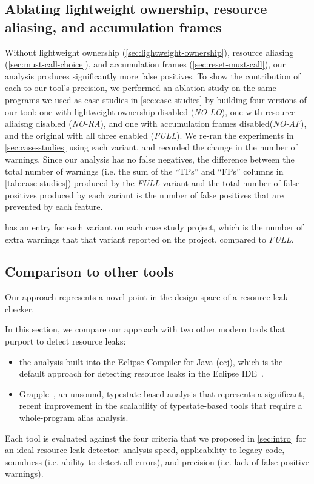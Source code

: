 \subsection{Ablating lightweight ownership, resource aliasing, and accumulation frames}
\label{sec:ablation}

Without lightweight ownership (\cref{sec:lightweight-ownership}),
resource aliasing (\cref{sec:must-call-choice}), and
accumulation frames (\cref{sec:reset-must-call}), our analysis produces significantly
more false positives. To show the contribution of each to our tool's precision,
we performed an ablation study on the same programs we used as case studies in
\cref{sec:case-studies} by building four versions of our tool:
one with lightweight ownership disabled (\emph{NO-LO}),
one with resource aliaisng disabled (\emph{NO-RA}),
and one with accumulation frames disabled(\emph{NO-AF}),
and the original with all three enabled (\emph{FULL}).
We re-ran the experiments in \cref{sec:case-studies} using each variant, and
recorded the change in the number of warnings. Since our analysis has no false
negatives, the difference between the total number of warnings (i.e. the sum of
the ``TPs'' and ``FPs'' columns in \cref{tab:case-studies}) produced by the \emph{FULL}
variant and the total number of false positives produced by each variant is
the number of false positives that are prevented by each feature.

 has an entry for each variant on each case study project,
which is the number of extra warnings that that variant reported on the project,
compared to \emph{FULL}.

\subsection{Comparison to other tools}
\label{sec:compare}

Our approach represents a novel point in the design space of a resource leak checker.

In this section, we compare our approach with two other modern tools that purport to detect resource leaks:
\begin{itemize}
\item the analysis built into the Eclipse Compiler for Java (ecj), which is the default approach
  for detecting resource leaks in the Eclipse IDE~\cite{ecj-resource-leak}.
\item Grapple~\cite{zuo2019grapple}, an unsound, typestate-based analysis that represents a significant, recent
  improvement in the scalability of typestate-based tools that require a whole-program alias analysis.
\end{itemize}
Each tool is evaluated against the four criteria that we proposed in \cref{sec:intro}
for an ideal resource-leak detector: analysis speed, applicability to legacy code, soundness (i.e. ability
to detect all errors), and precision (i.e. lack of false positive warnings).

